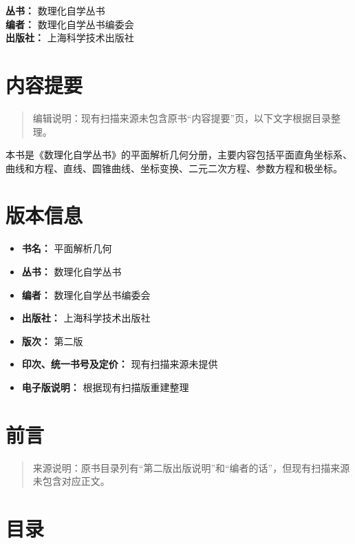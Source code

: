 \textbf{丛书：} 数理化自学丛书\\
\textbf{编者：} 数理化自学丛书编委会\\
\textbf{出版社：} 上海科学技术出版社

\chapter{内容提要}\label{ux5185ux5bb9ux63d0ux8981}

\begin{quote}
编辑说明：现有扫描来源未包含原书``内容提要''页，以下文字根据目录整理。
\end{quote}

本书是《数理化自学丛书》的平面解析几何分册，主要内容包括平面直角坐标系、曲线和方程、直线、圆锥曲线、坐标变换、二元二次方程、参数方程和极坐标。

\chapter{版本信息}\label{ux7248ux672cux4fe1ux606f}

\begin{itemize}
\tightlist
\item
  \textbf{书名：} 平面解析几何
\item
  \textbf{丛书：} 数理化自学丛书
\item
  \textbf{编者：} 数理化自学丛书编委会
\item
  \textbf{出版社：} 上海科学技术出版社
\item
  \textbf{版次：} 第二版
\item
  \textbf{印次、统一书号及定价：} 现有扫描来源未提供
\item
  \textbf{电子版说明：} 根据现有扫描版重建整理
\end{itemize}

\chapter{前言}\label{ux524dux8a00}

\begin{quote}
来源说明：原书目录列有``第二版出版说明''和``编者的话''，但现有扫描来源未包含对应正文。
\end{quote}

\chapter{目录}\label{ux76eeux5f55}

